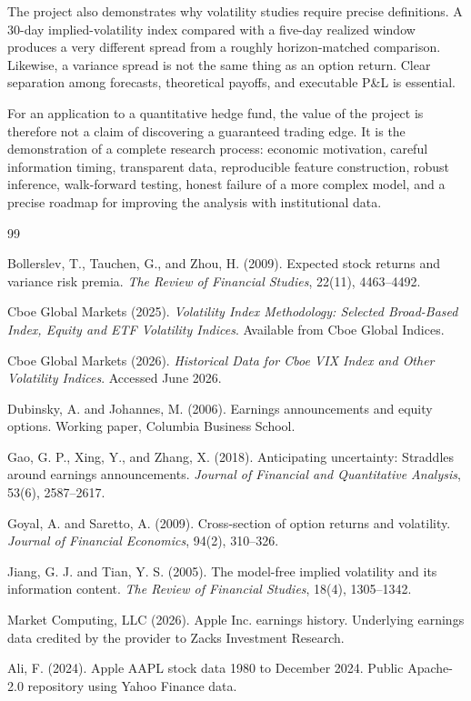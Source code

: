 \documentclass[11pt]{article}
\begin{document}
The project also demonstrates why volatility studies require precise definitions. A 30-day implied-volatility index compared with a five-day realized window produces a very different spread from a roughly horizon-matched comparison. Likewise, a variance spread is not the same thing as an option return. Clear separation among forecasts, theoretical payoffs, and executable P\&L is essential.

For an application to a quantitative hedge fund, the value of the project is therefore not a claim of discovering a guaranteed trading edge. It is the demonstration of a complete research process: economic motivation, careful information timing, transparent data, reproducible feature construction, robust inference, walk-forward testing, honest failure of a more complex model, and a precise roadmap for improving the analysis with institutional data.

\begin{thebibliography}{99}

Bollerslev, T., Tauchen, G., and Zhou, H. (2009).
Expected stock returns and variance risk premia.
\emph{The Review of Financial Studies}, 22(11), 4463--4492.

Cboe Global Markets (2025).
\emph{Volatility Index Methodology: Selected Broad-Based Index, Equity and ETF Volatility Indices}.
Available from Cboe Global Indices.

Cboe Global Markets (2026).
\emph{Historical Data for Cboe VIX Index and Other Volatility Indices}.
Accessed June 2026.

Dubinsky, A. and Johannes, M. (2006).
Earnings announcements and equity options.
Working paper, Columbia Business School.

Gao, G. P., Xing, Y., and Zhang, X. (2018).
Anticipating uncertainty: Straddles around earnings announcements.
\emph{Journal of Financial and Quantitative Analysis}, 53(6), 2587--2617.

Goyal, A. and Saretto, A. (2009).
Cross-section of option returns and volatility.
\emph{Journal of Financial Economics}, 94(2), 310--326.

Jiang, G. J. and Tian, Y. S. (2005).
The model-free implied volatility and its information content.
\emph{The Review of Financial Studies}, 18(4), 1305--1342.

Market Computing, LLC (2026).
Apple Inc. earnings history.
Underlying earnings data credited by the provider to Zacks Investment Research.

Ali, F. (2024).
Apple AAPL stock data 1980 to December 2024.
Public Apache-2.0 repository using Yahoo Finance data.

\end{thebibliography}
\end{document}
